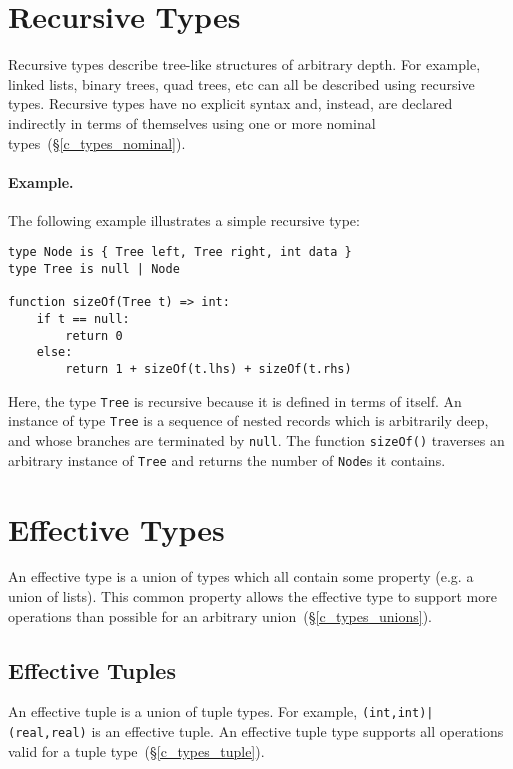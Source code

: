 \section{Recursive Types}
\label{c_types_recursive}

Recursive types describe tree-like structures of arbitrary depth.  For example, linked lists, binary trees, quad trees, etc can all be described using recursive types.  Recursive types have no explicit syntax and, instead, are declared indirectly in terms of themselves using one or more nominal types~(\S\ref{c_types_nominal}).\\

\paragraph{Example.} The following example illustrates a simple recursive type:

\begin{lstlisting}
type Node is { Tree left, Tree right, int data }
type Tree is null | Node

function sizeOf(Tree t) => int:
    if t == null:
        return 0
    else:
        return 1 + sizeOf(t.lhs) + sizeOf(t.rhs)
\end{lstlisting}

Here, the type \lstinline{Tree} is recursive because it is defined in terms of itself.  An instance of type \lstinline{Tree} is a sequence of nested records which is arbitrarily deep, and whose branches are terminated by \lstinline{null}.  The function \lstinline{sizeOf()} traverses an arbitrary instance of \lstinline{Tree} and returns the number of \lstinline{Node}s it contains.

\section{Effective Types}
\label{c_types_effective}
An effective type is a union of types which all contain some property (e.g. a union of lists).  This common property allows the effective type to support more operations than possible for an arbitrary union~(\S\ref{c_types_unions}).

\subsection{Effective Tuples}

An effective tuple is a union of tuple types.  For example, \lstinline{(int,int)|(real,real)} is an effective tuple.  An effective tuple type supports all operations valid for a tuple type~(\S\ref{c_types_tuple}).

